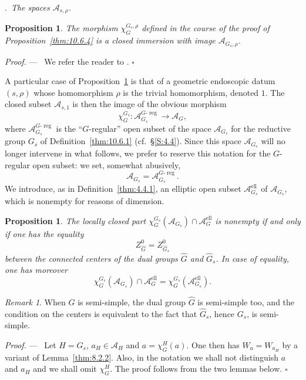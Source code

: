\documentclass[12pt,a4paper,oneside,english,leqno]{smfart}
\makeatletter
\numberwithin{equation}{subsection}
\newcounter{theo}
\numberwithin{theo}{subsection}
\newenvironment{paragr}[1][]{\medskip\refstepcounter{subsection}%
  \par\noindent\hspace*{\parindent}\thesubsection.\ \emph{#1}%
  \@ifundefined{@empty}{}{}\ignorespaces}{\medskip}
\theoremstyle{plain}
\newtheorem{proposition}[theo]{Proposition}
\theoremstyle{definition}
\theoremstyle{remark}
\newtheorem{remark}[theo]{Remark}
\newenvironment{preuve}[1][]{\medskip\noindent\textit{Proof.} #1 ---\ }%
  {\hfill\ensuremath{\square}\medskip}
\DeclareMathOperator{\reg}{reg}
\DeclareMathOperator{\el}{ell}
\newcommand{\Ac}{\mathcal{A}}
\newcommand{\Gc}{\widehat{G}}
\makeatother
\begin{document}
\begin{paragr}[The spaces $\Ac_{s,\rho}$.]
\begin{proposition}\label{thm:10.6.5}
The morphism $\chi_G^{G_s,\rho}$ defined in the course of the proof of Proposition~\ref{thm:10.6.4} is a closed immersion with image $\Ac_{G_s,\rho}$.
\end{proposition}

\begin{preuve}
We refer the reader to \cite[props.\ 6.3.2 and 6.3.3]{Ngo-lemme}.
\end{preuve}

A particular case of Proposition~\ref{thm:10.6.5} is that of a geometric endoscopic datum $(s,\rho)$ whose homomorphism $\rho$ is the trivial homomorphism, denoted $1$. The closed subset $\Ac_{s,1}$ is then the image of the obvious morphism
$$\chi_G^{G_s} : \Ac_{G_s}^{G\text{-}\reg}\to\Ac_G,$$
where $\Ac_{G_s}^{G\text{-}\reg}$ is the ``$G$-regular'' open subset of the space $\Ac_{G_s}$ for the reductive group $G_s$ of Definition~\ref{thm:10.6.1} (cf.\ \S\ref{S:4.4}). Since this space $\Ac_{G_s}$ will no longer intervene in what follows, we prefer to reserve this notation for the $G$-regular open subset: we set, somewhat abusively,
$$\Ac_{G_s} = \Ac_{G_s}^{G\text{-}\reg}.$$
We introduce, as in Definition~\ref{thm:4.4.1}, an elliptic open subset $\Ac_{G_s}^{\el}$ of $\Ac_{G_s}$, which is nonempty for reasons of dimension.

\begin{proposition}\label{thm:10.6.6}
The locally closed part $\chi_G^{G_s}(\Ac_{G_s})\cap\Ac_G^{\el}$ is nonempty if and only if one has the equality
$$Z_{\Gc}^0 = Z_{\Gc_s}^0$$
between the connected centers of the dual groups $\Gc$ and $\Gc_s$. In case of equality, one has moreover
$$\chi_G^{G_s}(\Ac_{G_s})\cap\Ac_G^{\el} = \chi_G^{G_s}(\Ac_{G_s}^{\el}).$$
\end{proposition}

\begin{remark}\label{thm:10.6.7}
When $G$ is semi-simple, the dual group $\Gc$ is semi-simple too, and the condition on the centers is equivalent to the fact that $\Gc_s$, hence $G_s$, is semi-simple.
\end{remark}

\begin{preuve}
Let $H = G_s$, $a_H\in\Ac_H$ and $a = \chi_G^H(a)$. One then has $W_a = W_{a_H}$ by a variant of Lemma~\ref{thm:8.2.2}. Also, in the notation we shall not distinguish $a$ and $a_H$ and we shall omit $\chi_G^H$. The proof follows from the two lemmas below.
\end{preuve}


\end{paragr}
\end{document}
